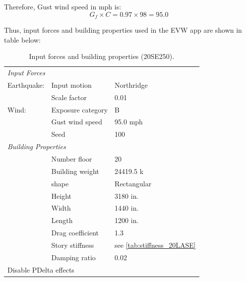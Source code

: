 \documentclass[onecolumn, fleqn]{article}
\begin{document}
Therefore, Gust wind speed in mph is:
\begin{equation*}
G_f \times C = 0.97 \times 98 = \boxed{95.0}
\end{equation*}

Thus, input forces and building properties used in the EVW app are shown in table below:

\begin{table}[H]
	\centering \caption{Input forces and building properties (20SE250).}
	\begin{tabular}{lll}
	\toprule
	\multicolumn{3}{l}{\textit{Input Forces}}					\\
	\cmidrule(rl){1-3}
	Earthquake:		& Input motion		& Northridge			\\
					& Scale factor		& 0.01					\\
	Wind:			& Exposure category	& B						\\
					& Gust wind speed	& 95.0 mph				\\
					& Seed				& 100					\\
	\midrule
	\multicolumn{3}{l}{\textit{Building Properties}}			\\
	\cmidrule(rl){1-3}
					& Number floor		& 20					\\
					& Building weight	& 24419.5 k				\\
					& shape				& Rectangular			\\
					& Height			& 3180 in.				\\
					& Width				& 1440 in.				\\
					& Length			& 1200 in.				\\
					& Drag coefficient	& 1.3					\\
					& Story stiffness	& see \cref{tab:stiffness_20LASE}			\\
					& Damping ratio		& 0.02					\\
	\midrule
	\multicolumn{3}{l}{Disable PDelta effects}					\\
	\bottomrule
	\end{tabular}
\end{table}
\end{document}
